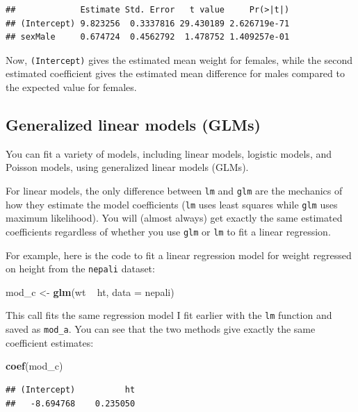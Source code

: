 \documentclass[]{book}
\makeatletter
\newenvironment{Shaded}{\begin{snugshade}}{\end{snugshade}}
\newcommand{\KeywordTok}[1]{\textcolor[rgb]{0.13,0.29,0.53}{\textbf{{#1}}}}
\newcommand{\DataTypeTok}[1]{\textcolor[rgb]{0.13,0.29,0.53}{{#1}}}
\newcommand{\StringTok}[1]{\textcolor[rgb]{0.31,0.60,0.02}{{#1}}}
\newcommand{\NormalTok}[1]{{#1}}
\newenvironment{kframe}{%
\medskip{}
\setlength{\fboxsep}{.8em}
 \def\at@end@of@kframe{}%
 \ifinner\ifhmode%
  \def\at@end@of@kframe{\end{minipage}}%
  \begin{minipage}{\columnwidth}%
 \fi\fi%
 \def\FrameCommand##1{\hskip\@totalleftmargin \hskip-\fboxsep
 \colorbox{shadecolor}{##1}\hskip-\fboxsep
     \hskip-\linewidth \hskip-\@totalleftmargin \hskip\columnwidth}%
 \MakeFramed {\advance\hsize-\width
   \@totalleftmargin\z@ \linewidth\hsize
   \@setminipage}}%
 {\par\unskip\endMakeFramed%
 \at@end@of@kframe}
\renewenvironment{Shaded}{\begin{kframe}}{\end{kframe}}
\makeatother
\begin{document}
\begin{verbatim}
##             Estimate Std. Error   t value     Pr(>|t|)
## (Intercept) 9.823256  0.3337816 29.430189 2.626719e-71
## sexMale     0.674724  0.4562792  1.478752 1.409257e-01
\end{verbatim}

Now, \texttt{(Intercept)} gives the estimated mean weight for females,
while the second estimated coefficient gives the estimated mean
difference for males compared to the expected value for females.

\subsection{Generalized linear models
(GLMs)}\label{generalized-linear-models-glms}

You can fit a variety of models, including linear models, logistic
models, and Poisson models, using generalized linear models (GLMs).
\medskip

For linear models, the only difference between \texttt{lm} and
\texttt{glm} are the mechanics of how they estimate the model
coefficients (\texttt{lm} uses least squares while \texttt{glm} uses
maximum likelihood). You will (almost always) get exactly the same
estimated coefficients regardless of whether you use \texttt{glm} or
\texttt{lm} to fit a linear regression.

For example, here is the code to fit a linear regression model for
weight regressed on height from the \texttt{nepali} dataset:

\begin{Shaded}
\begin{Highlighting}[]
\NormalTok{mod_c <-}\StringTok{ }\KeywordTok{glm}\NormalTok{(wt ~}\StringTok{ }\NormalTok{ht, }\DataTypeTok{data =} \NormalTok{nepali)}
\end{Highlighting}
\end{Shaded}

This call fits the same regression model I fit earlier with the
\texttt{lm} function and saved as \texttt{mod\_a}. You can see that the
two methods give exactly the same coefficient estimates:

\begin{Shaded}
\begin{Highlighting}[]
\KeywordTok{coef}\NormalTok{(mod_c)}
\end{Highlighting}
\end{Shaded}

\begin{verbatim}
## (Intercept)          ht 
##   -8.694768    0.235050
\end{verbatim}
\end{document}
